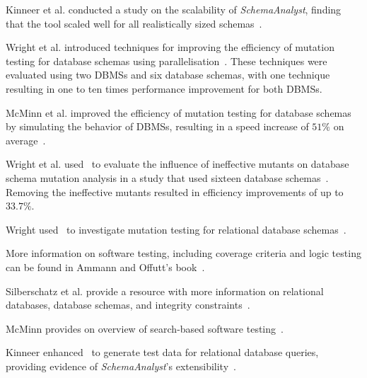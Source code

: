 Kinneer et al. conducted a study on the scalability of \textit{SchemaAnalyst}, finding that the tool scaled well for all
realistically sized schemas~\cite{kinneer2015automatically, Kinneer2015a}.

Wright et al. introduced techniques for improving the efficiency of mutation testing for database schemas using
parallelisation~\cite{wright2013efficient}. These techniques were evaluated using two DBMSs and six database schemas,
with one technique resulting in one to ten times performance improvement for both DBMSs.

McMinn et al. improved the efficiency of mutation testing for database schemas by simulating the behavior of DBMSs,
resulting in a speed increase of $51\%$ on average~\cite{mcminn2016virtual}.

Wright et al. used \sa~to evaluate the influence of ineffective mutants on database schema mutation
analysis in a study that used sixteen database schemas~\cite{wright2014impact}. Removing the ineffective mutants
resulted in efficiency improvements of up to $33.7\%$.

Wright used \sa~to investigate mutation testing for relational database
schemas~\cite{wright2015mutation}.





More information on software testing, including coverage criteria and logic testing can be found in Ammann and Offutt's
book~\cite{ammann2008}.

Silberschatz et al. provide a resource with more information on relational databases, database schemas, and integrity
constraints~\cite{databasebook}.

McMinn provides on overview of search-based software testing~\cite{STVR:STVR294}.

Kinneer enhanced \sa~to generate test data for relational database queries, providing evidence of
\textit{SchemaAnalyst}'s extensibility~\cite{kinneer2016comp}.
